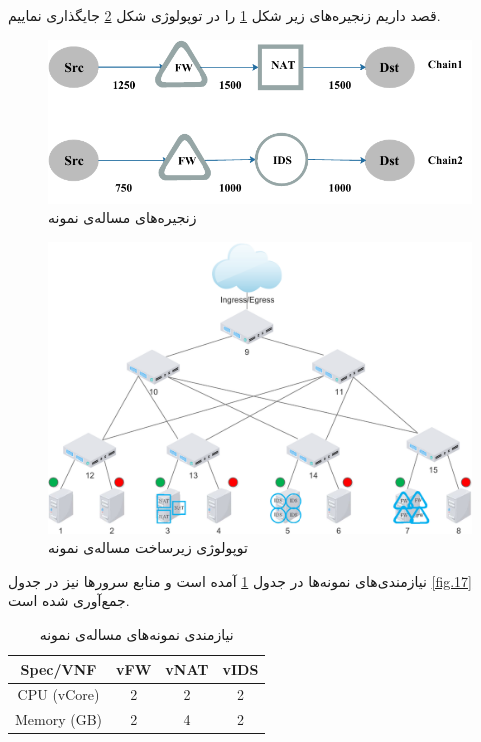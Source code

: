 قصد داریم زنجیره‌های زیر شکل \ref{fig.14} را در توپولوژی شکل \ref{fig.15} جایگذاری نماییم.


\begin{figure}[h]
\center\includegraphics[scale=1]{images/example-chains.pdf}
\caption{زنجیره‌های مساله‌ی نمونه}
\label{fig.14}
\end{figure}


\begin{figure}[h]
\center\includegraphics[scale=.75]{images/example-topology.pdf}
\caption{توپولوژی زیرساخت مساله‌ی نمونه}
\label{fig.15}
\end{figure}

نیازمندی‌های نمونه‌ها در جدول \ref{fig.16} آمده است و منابع سرور‌ها نیز در جدول \ref{fig.17} جمع‌آوری شده است.

\begin{table}[h]
    \caption{نیازمندی نمونه‌های مساله‌ی نمونه}
    \vspace{0.5cm}
    \begin{center}\begin{latin}\begin{tabular}{|c|c|c|c|}
        \hline
        Spec/VNF & vFW & vNAT & vIDS \\
        \hline
        CPU (vCore) & 2 & 2 & 2 \\
        \hline
        Memory (GB) & 2 & 4 & 2 \\
        \hline
    \end{tabular}\end{latin}\end{center}
    \label{fig.16}
\end{table}


